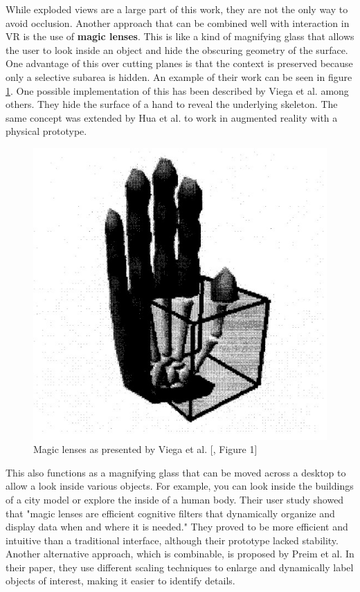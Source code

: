 While exploded views are a large part of this work, they are not the only way to avoid occlusion. 
Another approach that can be combined well with interaction in VR is the use of \textbf{magic lenses}.
This is like a kind of magnifying glass that allows the user to look inside an object and hide the obscuring geometry of the surface.
One advantage of this over cutting planes is that the context is preserved because only a selective subarea is hidden.   
An example of their work can be seen in figure \ref{fig:viega_hand}.
One possible implementation of this has been described by Viega et al. among others.\cite{Viega_1996}
They hide the surface of a hand to reveal the underlying skeleton.
The same concept was extended by Hua et al. to work in augmented reality with a physical prototype.\cite{Hua_2006}
\begin{figure}
	\centering
	\vspace{-0.4cm}
	\includegraphics[width=1\linewidth]{fig/Images/Viega_fig1}
	\caption[]{Magic lenses as presented by Viega et al. [\cite{Viega_1996}, Figure 1]}
	\label{fig:viega_hand}
	\vspace{-0.1cm}
\end{figure}
This also functions as a magnifying glass that can be moved across a desktop to allow a look inside various objects.
For example, you can look inside the buildings of a city model or explore the inside of a human body.
Their user study showed that "magic lenses are efficient cognitive filters that dynamically organize and display data when and where it is needed."\cite{Hua_2006}
They proved to be more efficient and intuitive than a traditional interface, although their prototype lacked stability.
Another alternative approach, which is combinable, is proposed by Preim et al. In their paper, they use different scaling techniques to enlarge and dynamically label objects of interest, making it easier to identify details.\cite{Preim_1997}

